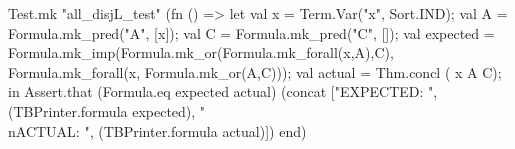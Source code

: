 \nwenddocs{}\endmoddef\nwstartdeflinemarkup{}\nwenddeflinemarkup
  Test.mk "all_disjL_test" (fn () =>
    let
      val x = Term.Var("x", Sort.IND);
      val A = Formula.mk_pred("A", [x]);
      val C = Formula.mk_pred("C", []);
      val expected = Formula.mk_imp(Formula.mk_or(Formula.mk_forall(x,A),C),
                                    Formula.mk_forall(x, Formula.mk_or(A,C)));
      val actual = Thm.concl ( x A C);
    in
      Assert.that (Formula.eq expected actual)
                  (concat ["EXPECTED: ",
                           (TBPrinter.formula expected),
                           "\\nACTUAL: ",
                           (TBPrinter.formula actual)])
    end)
